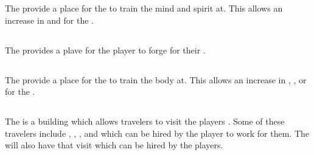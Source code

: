 The  provide a place for the  to train the mind and spirit at. This allows an increase in  and  for the .

\subsection{}

The  provides a plave for the player to forge  for their . 

\subsection{}

The  provide a place for the  to train the body at. This allows an increase in , , or  for the .

\subsection{}

The  is a building which allows travelers to visit the players . Some of these travelers include , , , and  which can be hired by the player to work for them. The  will also have  that visit which can be hired by the players.

\subsection{}

\subsection{}

\subsection{}

\subsection{}

\subsection{}
